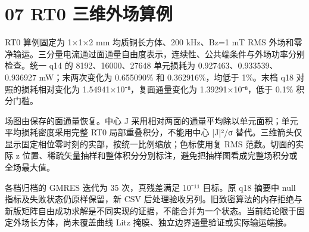 \documentclass[journal,10pt]{IEEEtran}
\begin{document}
\section*{07 RT0 三维外场算例}
\hypertarget{chapter-07}{}
RT0 算例固定为 1×1×2 mm 均质铜长方体、200 kHz、Bz=1 mT RMS 外场和零净输运。三分量电流通过面通量自由度表示，连续性、公共端条件与外场功率分别检查。统一 q14 的 8192、16000、27648 单元损耗为 0.927463、0.933539、0.936927 mW；末两次变化为 0.655090\% 和 0.362916\%，均低于 1\%。末档 q18 对照的损耗相对变化为 1.54941×10⁻⁸，复面通量变化为 1.39291×10⁻⁸，低于 0.1\% 积分门槛。


场图由保存的面通量恢复。中心 J 采用相对两面的通量平均除以单元面积；单元平均损耗密度采用完整 RT0 局部重叠积分，不能用中心 |J|²/σ 替代。三维箭头仅显示固定相位零时刻的实部，按统一比例缩放；色标使用复 RMS 范数。切面的实际 z 位置、稀疏矢量抽样和整体积分分别标注，避免把抽样图看成完整场积分或全场最大值。


各档归档的 GMRES 迭代为 35 次，真残差满足 10⁻¹¹ 目标。原 q18 摘要中 null 指标及失败状态仍原样保留，新 CSV 后处理验收另列。旧致密算法的内存拒绝与新版矩阵自由成功求解是不同实现的证据，不能合并为一个状态。当前结论限于固定外场长方体，尚未覆盖曲线 Litz 掩膜、独立边界通量验证或实际输运端接。
\end{document}
